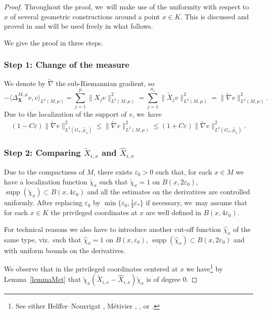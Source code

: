 \documentclass[JEP,XML,SOM,Unicode,published]{cedram}
\newcommand{\bX}{{\boldsymbol{X}}}
\theoremstyle{definition}
\let\epsilon\varepsilon
\let\Xb\bX
\newcommand{\1}{\mathbbm{1}}
\DeclareMathOperator{\supp}{supp}
\begin{document}
\begin{proof}
Throughout the proof, we~will make use of the uniformity with respect to~$x$ of several geometric constructions around a point $x\in K$. This is discussed and proved in \cite{Me,HN, HN1,Rot} and will be used freely in what follows.

We give the proof in three steps.

\subsubsection*{Step 1: Change of the measure}
We denote by $\tilde\nabla$ the sub-Riemannian gradient, so
\[
-\langle\Delta_\Xb^{M,\mu} v,v\rangle_{L^2(M,\mu)} = \sum_{j=1}^p \|X_j v\|_{L^2(M,\mu)}^2 = \sum_{j=1}^{n_1} \|\tilde X_j v\|_{L^2(M,\mu)}^2 = \| \tilde\nabla v \|_{L^2(M,\mu)}^2.
\]
Due to the localization of the support of $v$, we~have
\begin{align*}
(1-C\varepsilon) \| \tilde\nabla v \|_{L^2(G_x,\widehat\mu_x)}^2
\leq \| \tilde\nabla v \|_{L^2(M,\mu)}^2
\leq (1+C\varepsilon) \| \tilde\nabla v \|_{L^2(G_x,\widehat\mu_x)}^2.
\end{align*}

\subsubsection*{Step 2: Comparing $\tilde X_{i,x}$ and $\widehat X_{i,x}$}
Due to the compactness of $M$, there exists $\epsilon_0>0$ such that, for each $x\in M$ we have a localization function $\tilde \chi_x$ such that $\tilde \chi_x = 1$ on $B(x, 2\epsilon_0)$, $\supp(\tilde \chi_x) \subset B (x,4\epsilon_0)$ and all the estimates on the derivatives are controlled uniformly. After replacing $\epsilon_0$ by $\min\{\epsilon_0,\frac14\epsilon_*\}$ if necessary, we~may assume that for each $x\in K$ the privileged coordinates at $x$ are well defined in $B(x,4\varepsilon_0)$.

For technical reasons we also have to introduce another cut-off function $\widehat \chi_x$ of the same type, viz.\ such that $\widehat \chi_x = 1$ on $B(x, \epsilon_0)$, $\supp(\widehat \chi_x) \subset B (x,2\epsilon_0)$ and with uniform bounds on the derivatives.

We observe that in the privileged coordinates centered at $x$ we have\footnote{See either Helffer--Nourrigat \cite[Prop.\,5.1]{HN}, Métivier \cite{Me}, \cite[\S 4.2.4]{EL}, or \cite[\S 1]{Rot}.} by Lemma~\ref{lemmaMet} that
$
\tilde \chi_x (\tilde X_{i,x} -\widehat X_{i,x}) \tilde\chi_x
$
is of degree $0$.


\end{proof}
\end{document}
